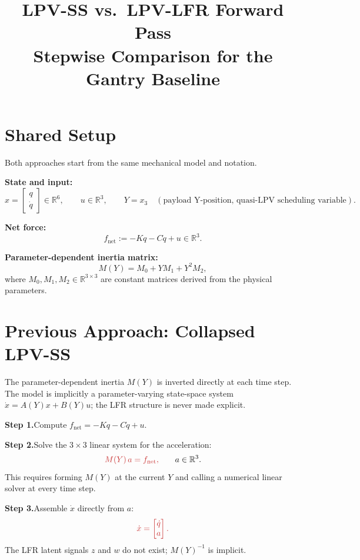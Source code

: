 \documentclass[11pt]{article}
\title{LPV-SS vs.\ LPV-LFR Forward Pass\\
\large Stepwise Comparison for the Gantry Baseline}
\author{}
\date{}
\newcommand{\stepbox}[2]{%
  \noindent\textbf{Step #1.}\quad #2\par\medskip
}
\begin{document}
\maketitle

\section*{Shared Setup}

Both approaches start from the same mechanical model and notation.

\medskip
\noindent\textbf{State and input:}
\[
  x = \begin{bmatrix} q \\ \dot{q} \end{bmatrix} \in \mathbb{R}^6,
  \qquad
  u \in \mathbb{R}^3,
  \qquad
  Y = x_3 \quad (\text{payload Y-position, quasi-LPV scheduling variable}).
\]

\noindent\textbf{Net force:}
\[
  f_{\mathrm{net}} := -Kq - C\dot{q} + u \in \mathbb{R}^3.
\]

\noindent\textbf{Parameter-dependent inertia matrix:}
\[
  M(Y) = M_0 + Y M_1 + Y^2 M_2,
\]
where $M_0, M_1, M_2 \in \mathbb{R}^{3\times3}$ are constant matrices
derived from the physical parameters.

\section{Previous Approach: Collapsed LPV-SS}

The parameter-dependent inertia $M(Y)$ is inverted directly at each
time step. The model is implicitly a parameter-varying state-space
system $\dot{x} = A(Y)x + B(Y)u$; the LFR structure is never made explicit.

\medskip

\stepbox{1}{Compute $f_{\mathrm{net}} = -Kq - C\dot{q} + u$.}

\stepbox{2}{Solve the $3\times3$ linear system for the acceleration:
\[
  {\color{oldcolor} M(Y)\,a = f_{\mathrm{net}},}
  \qquad a \in \mathbb{R}^3.
\]
This requires forming $M(Y)$ at the current $Y$ and calling a
numerical linear solver at every time step.}

\stepbox{3}{Assemble $\dot{x}$ directly from $a$:
\[
  {\color{oldcolor} \dot{x} = \begin{bmatrix} \dot{q} \\ a \end{bmatrix}.}
\]
The LFR latent signals $z$ and $w$ do not exist; $M(Y)^{-1}$
is implicit.}
\end{document}
